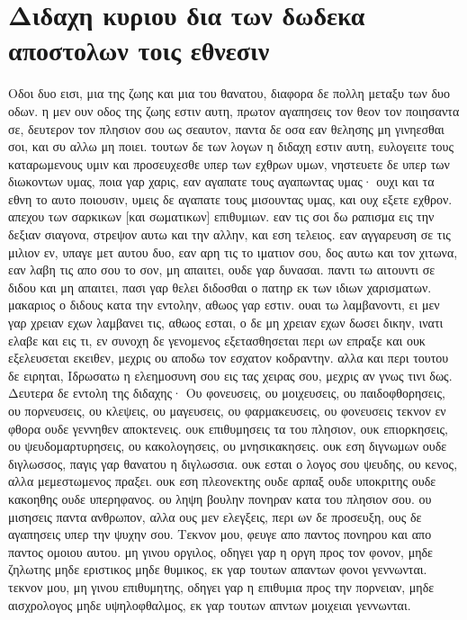 \section{Διδαχη κυριου δια των δωδεκα αποστολων τοις εθνεσιν}
Οδοι δυο εισι, μια της ζωης και μια του θανατου, διαφορα δε πολλη μεταξυ των δυο οδων.
η μεν ουν οδος της ζωης εστιν αυτη, πρωτον αγαπησεις τον θεον τον ποιησαντα σε, δευτερον τον πλησιον σου ως σεαυτον, παντα δε οσα εαν θελησης μη γινηεσθαι σοι, και συ αλλω μη ποιει.
τουτων δε των λογων η διδαχη εστιν αυτη, ευλογειτε τους καταρωμενους υμιν και προσευχεσθε υπερ των εχθρων υμων, νηστευετε δε υπερ των διωκοντων υμας, ποια γαρ χαρις, εαν αγαπατε τους αγαπωντας υμας· ουχι και τα εθνη το αυτο ποιουσιν, υμεις δε αγαπατε τους μισουντας υμας, και ουχ εξετε εχθρον.
απεχου των σαρκικων [και σωματικων] επιθυμιων. εαν τις σοι δω ραπισμα εις την δεξιαν σιαγονα, στρεψον αυτω και την αλλην, και εση τελειος. εαν αγγαρευση σε τις μιλιον εν, υπαγε μετ αυτου δυο, εαν αρη τις το ιματιον σου, δος αυτω και τον χιτωνα, εαν λαβη τις απο σου το σον, μη απαιτει, ουδε γαρ δυνασαι.
παντι τω αιτουντι σε διδου και μη απαιτει, πασι γαρ θελει διδοσθαι ο πατηρ εκ των ιδιων χαρισματων. μακαριος ο διδους κατα την εντολην, αθωος γαρ εστιν. ουαι τω λαμβανοντι, ει μεν γαρ χρειαν εχων λαμβανει τις, αθωος εσται, ο δε μη χρειαν εχων δωσει δικην, ινατι ελαβε και εις τι, εν συνοχη δε γενομενος εξετασθησεται περι ων επραξε και ουκ εξελευσεται εκειθεν, μεχρις ου αποδω τον εσχατον κοδραντην.
αλλα και περι τουτου δε ειρηται, Ιδρωσατω η ελεημοσυνη σου εις τας χειρας σου, μεχρις αν γνως τινι δως.
Δευτερα δε εντολη της διδαχης·
Ου φονευσεις, ου μοιχευσεις, ου παιδοφθορησεις, ου πορνευσεις, ου κλεψεις, ου μαγευσεις, ου φαρμακευσεις, ου φονευσεις τεκνον εν φθορα ουδε γεννηθεν αποκτενεις.
ουκ επιθυμησεις τα του πλησιον, ουκ επιορκησεις, ου ψευδομαρτυρησεις, ου κακολογησεις, ου μνησικακησεις.
ουκ εση διγνωμων ουδε διγλωσσος, παγις γαρ θανατου η διγλωσσια.
ουκ εσται ο λογος σου ψευδης, ου κενος, αλλα μεμεστωμενος πραξει.
ουκ εση πλεονεκτης ουδε αρπαξ ουδε υποκριτης ουδε κακοηθης ουδε υπερηφανος. ου ληψη βουλην πονηραν κατα του πλησιον σου.
ου μισησεις παντα ανθρωπον, αλλα ους μεν ελεγξεις, περι ων δε προσευξη, ους δε αγαπησεις υπερ την ψυχην σου.
Τεκνον μου, φευγε απο παντος πονηρου και απο παντος ομοιου αυτου.
μη γινου οργιλος, οδηγει γαρ η οργη προς τον φονον, μηδε ζηλωτης μηδε εριστικος μηδε θυμικος, εκ γαρ τουτων απαντων φονοι γεννωνται.
τεκνον μου, μη γινου επιθυμητης, οδηγει γαρ η επιθυμια προς την πορνειαν, μηδε αισχρολογος μηδε υψηλοφθαλμος, εκ γαρ τουτων απντων μοιχειαι γεννωνται.
